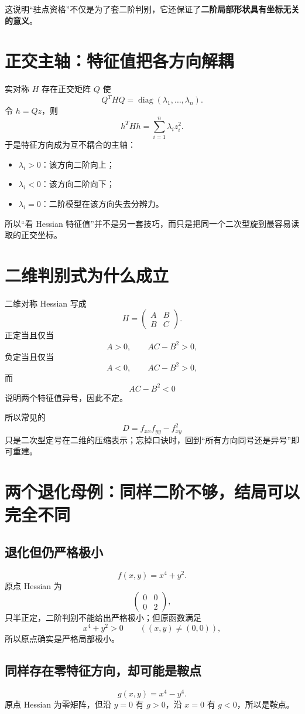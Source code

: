 \documentclass[profile=standard]{ipara-handbook}
\begin{document}
这说明“驻点资格”不仅是为了套二阶判别，它还保证了\textbf{二阶局部形状具有坐标无关的意义}。

\section{正交主轴：特征值把各方向解耦}
实对称 $H$ 存在正交矩阵 $Q$ 使
\[
Q^THQ=\operatorname{diag}(\lambda_1,\dots,\lambda_n).
\]
令 $h=Qz$，则
\[
h^THh=\sum_{i=1}^n\lambda_i z_i^2.
\]
于是特征方向成为互不耦合的主轴：
\begin{itemize}
\item $\lambda_i>0$：该方向二阶向上；
\item $\lambda_i<0$：该方向二阶向下；
\item $\lambda_i=0$：二阶模型在该方向失去分辨力。
\end{itemize}

所以“看 Hessian 特征值”并不是另一套技巧，而只是把同一个二次型旋到最容易读取的正交坐标。

\section{二维判别式为什么成立}
二维对称 Hessian 写成
\[
H=\begin{pmatrix}A&B\\B&C\end{pmatrix}.
\]
正定当且仅当
\[
A>0,
\qquad AC-B^2>0,
\]
负定当且仅当
\[
A<0,
\qquad AC-B^2>0,
\]
而
\[
AC-B^2<0
\]
说明两个特征值异号，因此不定。

所以常见的
\[
D=f_{xx}f_{yy}-f_{xy}^2
\]
只是二次型定号在二维的压缩表示；忘掉口诀时，回到“所有方向同号还是异号”即可重建。

\section{两个退化母例：同样二阶不够，结局可以完全不同}
\subsection{退化但仍严格极小}
\[
f(x,y)=x^4+y^2.
\]
原点 Hessian 为
\[
\begin{pmatrix}0&0\\0&2\end{pmatrix},
\]
只半正定，二阶判别不能给出严格极小；但原函数满足
\[
x^4+y^2>0\qquad((x,y)\neq(0,0)),
\]
所以原点确实是严格局部极小。

\subsection{同样存在零特征方向，却可能是鞍点}
\[
g(x,y)=x^4-y^4.
\]
原点 Hessian 为零矩阵，但沿 $y=0$ 有 $g>0$，沿 $x=0$ 有 $g<0$，所以是鞍点。
\end{document}
